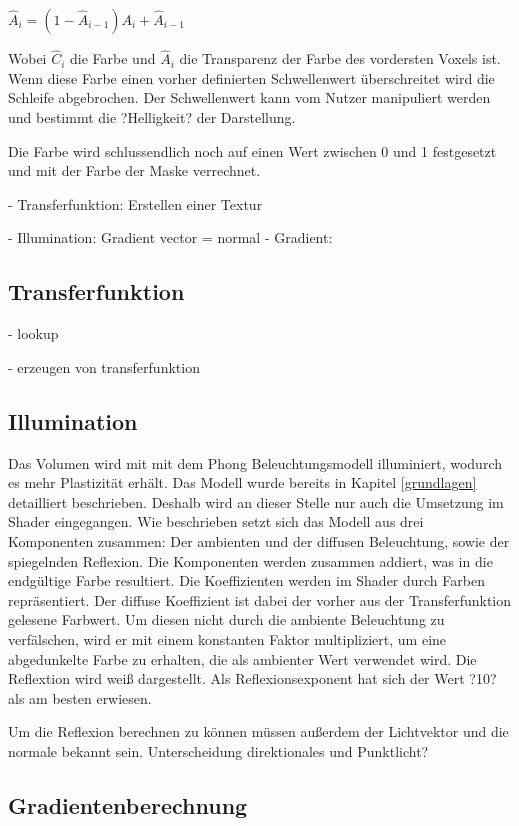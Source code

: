 $\hat{A}_{i}=(1-\hat{A}_{i-1})A_{i}+\hat{A}_{i-1}$

Wobei $\hat{C}_{i}$ die Farbe und $\hat{A}_{i}$ die Transparenz der Farbe des vordersten Voxels ist.
Wenn diese Farbe einen vorher definierten Schwellenwert überschreitet wird die Schleife abgebrochen. Der Schwellenwert kann vom Nutzer manipuliert werden und bestimmt die ?Helligkeit? der Darstellung.

Die Farbe wird schlussendlich noch auf einen Wert zwischen 0 und 1 festgesetzt und mit der Farbe der Maske verrechnet.



- Transferfunktion: Erstellen einer Textur

- Illumination: Gradient vector = normal
- Gradient: 



\subsection{Transferfunktion}
\label{transfer}

- lookup

- erzeugen von transferfunktion

\subsection{Illumination}
\label{illumination}

Das Volumen wird mit mit dem Phong Beleuchtungsmodell illuminiert, wodurch es mehr Plastizität erhält. Das Modell wurde bereits in Kapitel \ref{grundlagen} detailliert beschrieben. Deshalb wird an dieser Stelle nur auch die Umsetzung im Shader eingegangen.
Wie beschrieben setzt sich das Modell aus drei Komponenten zusammen: Der ambienten und der diffusen Beleuchtung, sowie der spiegelnden Reflexion. Die Komponenten werden zusammen addiert, was in die endgültige Farbe resultiert. 
Die Koeffizienten werden im Shader durch Farben repräsentiert. Der diffuse Koeffizient ist dabei der vorher aus der Transferfunktion gelesene Farbwert. Um diesen nicht durch die ambiente Beleuchtung zu verfälschen, wird er mit einem konstanten Faktor multipliziert, um eine abgedunkelte Farbe zu erhalten, die als ambienter Wert verwendet wird. Die Reflextion wird weiß dargestellt.
Als Reflexionsexponent hat sich der Wert ?10? als am besten erwiesen.

Um die Reflexion berechnen zu können müssen außerdem der Lichtvektor und die normale bekannt sein.
Unterscheidung direktionales und Punktlicht?

\subsection{Gradientenberechnung}
\label{gradienten}